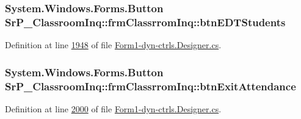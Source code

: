 \hypertarget{class_sr_p___classroom_inq_1_1frm_classrrom_inq_a527ceba70a2003fe9550f3fb3e307999}{
\subsubsection[{btn\-E\-D\-T\-Students}]{\setlength{\rightskip}{0pt plus 5cm}\-System.\-Windows.\-Forms.\-Button {\bf \-Sr\-P\-\_\-\-Classroom\-Inq\-::frm\-Classrrom\-Inq\-::btn\-E\-D\-T\-Students}}}
\label{class_sr_p___classroom_inq_1_1frm_classrrom_inq_a527ceba70a2003fe9550f3fb3e307999}


\-Definition at line \hyperlink{_form1-dyn-ctrls_8_designer_8cs_source_l01948}{1948} of file \hyperlink{_form1-dyn-ctrls_8_designer_8cs_source}{\-Form1-\/dyn-\/ctrls.\-Designer.\-cs}.

\hypertarget{class_sr_p___classroom_inq_1_1frm_classrrom_inq_a93fffe4de78481ddb21200cf66e89a17}{
\subsubsection[{btn\-Exit\-Attendance}]{\setlength{\rightskip}{0pt plus 5cm}\-System.\-Windows.\-Forms.\-Button {\bf \-Sr\-P\-\_\-\-Classroom\-Inq\-::frm\-Classrrom\-Inq\-::btn\-Exit\-Attendance}}}
\label{class_sr_p___classroom_inq_1_1frm_classrrom_inq_a93fffe4de78481ddb21200cf66e89a17}


\-Definition at line \hyperlink{_form1-dyn-ctrls_8_designer_8cs_source_l02000}{2000} of file \hyperlink{_form1-dyn-ctrls_8_designer_8cs_source}{\-Form1-\/dyn-\/ctrls.\-Designer.\-cs}.


